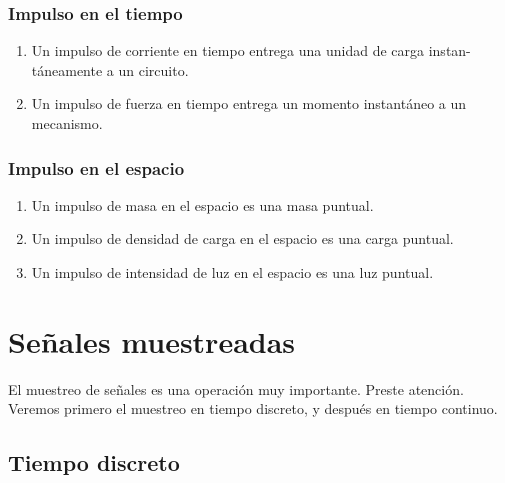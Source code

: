 \subsubsection{Impulso en el tiempo}

\begin{enumerate}
\item Un impulso de corriente en tiempo entrega una unidad de carga
  instan-t\'{a}neamente a un circuito.

\item Un impulso de fuerza en tiempo entrega un momento
  instant\'{a}neo a un mecanismo.
\end{enumerate}

\subsubsection{Impulso en el espacio}

\begin{enumerate}

\item Un impulso de masa en el espacio es una masa puntual.

\item Un impulso de densidad de carga en el espacio es una carga
  puntual.

\item Un impulso de intensidad de luz en el espacio es una luz
  puntual.
\end{enumerate}

% 
% 
% 
\section{Se\~{n}ales muestreadas}

El muestreo de se\~{n}ales es una operaci\'{o}n muy importante. Preste
atenci\'{o}n.  Veremos primero el muestreo en tiempo discreto, y despu\'{e}s en tiempo continuo.

\subsection{Tiempo discreto}

